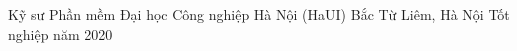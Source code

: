 

\begin{cventries}

  \cventry
    {Kỹ sư Phần mềm} %
    {Đại học Công nghiệp Hà Nội (HaUI)} %
    {Bắc Từ Liêm, Hà Nội} %
    {Tốt nghiệp năm 2020} %
    {
    }

\end{cventries}
